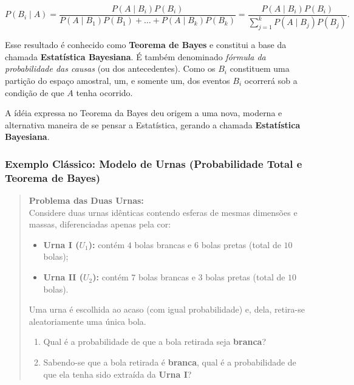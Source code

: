 \begin{equation}\label{bayes}
P(B_i \mid A) = \frac{P(A \mid B_i) P(B_i)}{P(A \mid B_1)P(B_1) + \dots + P(A \mid B_k)P(B_k)} = \frac{P(A \mid B_i) P(B_i)}{\sum_{j=1}^{k} P(A \mid B_j) P(B_j)}.
\end{equation}

\vskip0.3cm
Esse resultado é conhecido como \textbf{Teorema de Bayes} e constitui a base da chamada \textbf{Estatística Bayesiana}. É também denominado \textit{fórmula da probabilidade das causas} (ou dos antecedentes). Como os $B_{i}$ constituem uma partição do espaço amostral, um, e somente um, dos eventos $B_{i}$ ocorrerá sob a condição de que $A$ tenha ocorrido.


\newpage
A ídéia expressa no Teorema da Bayes deu origem a uma nova, moderna e alternativa maneira de se pensar a Estatística, gerando a chamada \textbf{Estatística Bayesiana}. 


\subsubsection*{Exemplo Clássico: Modelo de Urnas (Probabilidade Total e Teorema de Bayes)}

\begin{quote}
\textbf{Problema das Duas Urnas:} \\
Considere duas urnas idênticas contendo esferas de mesmas dimensões e massas, diferenciadas apenas pela cor:
\begin{itemize}
    \item \textbf{Urna I ($U_1$):} contém $4$ bolas brancas e $6$ bolas pretas (total de $10$ bolas);
    \item \textbf{Urna II ($U_2$):} contém $7$ bolas brancas e $3$ bolas pretas (total de $10$ bolas).
\end{itemize}
Uma urna é escolhida ao acaso (com igual probabilidade) e, dela, retira-se aleatoriamente uma única bola.
\begin{enumerate}
    \item[a)] Qual é a probabilidade de que a bola retirada seja \textbf{branca}?
    \item[b)] Sabendo-se que a bola retirada é \textbf{branca}, qual é a probabilidade de que ela tenha sido extraída da \textbf{Urna I}?
\end{enumerate}
\end{quote}

